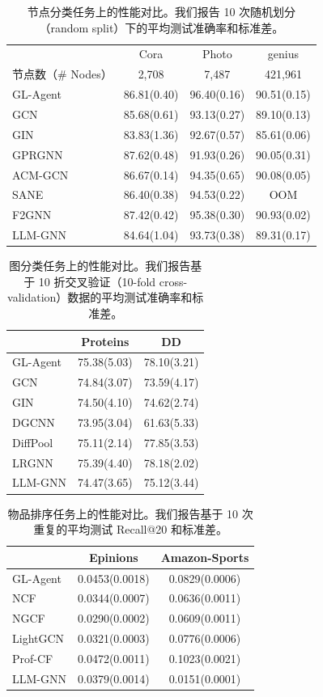 \documentclass[11pt,UTF8,fontset=fandol]{ctexart}
\begin{document}
\begin{table}[H]\centering
\caption{节点分类任务上的性能对比。我们报告 10 次随机划分（random split）下的平均测试准确率和标准差。}
\label{tab:3}
\begin{tabular}{lccc}
\toprule
 & Cora & Photo & genius \\
节点数（\# Nodes） & 2,708 & 7,487 & 421,961 \\
\midrule
GL-Agent & 86.81(0.40) & 96.40(0.16) & 90.51(0.15) \\
GCN & 85.68(0.61) & 93.13(0.27) & 89.10(0.13) \\
GIN & 83.83(1.36) & 92.67(0.57) & 85.61(0.06) \\
GPRGNN & 87.62(0.48) & 91.93(0.26) & 90.05(0.31) \\
ACM-GCN & 86.67(0.14) & 94.35(0.65) & 90.08(0.05) \\
SANE & 86.40(0.38) & 94.53(0.22) & OOM \\
F2GNN & 87.42(0.42) & 95.38(0.30) & 90.93(0.02) \\
LLM-GNN & 84.64(1.04) & 93.73(0.38) & 89.31(0.17) \\
\bottomrule
\end{tabular}
\end{table}

\begin{table}[H]\centering
\caption{图分类任务上的性能对比。我们报告基于 10 折交叉验证（10-fold cross-validation）数据的平均测试准确率和标准差。}
\label{tab:4}
\begin{tabular}{lcc}
\toprule
 & Proteins & DD \\
\midrule
GL-Agent & 75.38(5.03) & 78.10(3.21) \\
GCN & 74.84(3.07) & 73.59(4.17) \\
GIN & 74.50(4.10) & 74.62(2.74) \\
DGCNN & 73.95(3.04) & 61.63(5.33) \\
DiffPool & 75.11(2.14) & 77.85(3.53) \\
LRGNN & 75.39(4.40) & 78.18(2.02) \\
LLM-GNN & 74.47(3.65) & 75.12(3.44) \\
\bottomrule
\end{tabular}
\end{table}

\begin{table}[H]\centering
\caption{物品排序任务上的性能对比。我们报告基于 10 次重复的平均测试 Recall@20 和标准差。}
\label{tab:5}
\begin{tabular}{lcc}
\toprule
 & Epinions & Amazon-Sports \\
\midrule
GL-Agent & 0.0453(0.0018) & 0.0829(0.0006) \\
NCF & 0.0344(0.0007) & 0.0636(0.0011) \\
NGCF & 0.0290(0.0002) & 0.0609(0.0011) \\
LightGCN & 0.0321(0.0003) & 0.0776(0.0006) \\
Prof-CF & 0.0472(0.0011) & 0.1023(0.0021) \\
LLM-GNN & 0.0379(0.0014) & 0.0151(0.0001) \\
\bottomrule
\end{tabular}
\end{table}
\end{document}
